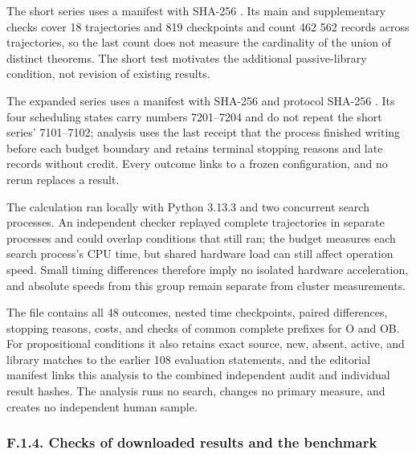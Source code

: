 \documentclass[pdflatex,sn-basic,Numbered]{sn-jnl}
\begin{document}
The short series  uses a manifest with SHA-256 . Its main and supplementary checks cover 18 trajectories and 819 checkpoints and count 462 562 records across trajectories, so the last count does not measure the cardinality of the union of distinct theorems. The short test motivates the additional passive-library condition, not revision of existing results.

The expanded series  uses a manifest with SHA-256  and protocol SHA-256 . Its four scheduling states carry numbers 7201--7204 and do not repeat the short series' 7101--7102; analysis uses the last receipt that the process finished writing before each budget boundary and retains terminal stopping reasons and late records without credit. Every outcome links to a frozen configuration, and no rerun replaces a result.

The calculation ran locally with Python 3.13.3 and two concurrent search processes. An independent checker replayed complete trajectories in separate processes and could overlap conditions that still ran; the budget measures each search process's CPU time, but shared hardware load can still affect operation speed. Small timing differences therefore imply no isolated hardware acceleration, and absolute speeds from this group remain separate from cluster measurements.

The file  contains all 48 outcomes, nested time checkpoints, paired differences, stopping reasons, costs, and checks of common complete prefixes for O and OB. For propositional conditions it also retains exact source, new, absent, active, and library matches to the earlier 108 evaluation statements, and the editorial manifest links this analysis to the combined independent audit and individual result hashes. The analysis runs no search, changes no primary measure, and creates no independent human sample.

\subsubsection*{F.1.4. Checks of downloaded results and the benchmark}\label{f.1.4.-checks-of-downloaded-results-and-the-benchmark}
\end{document}
